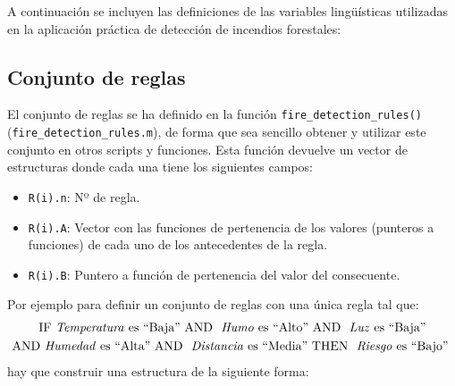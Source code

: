 A continuación se incluyen las definiciones de las variables lingüísticas utilizadas en la aplicación práctica de detección de incendios forestales:













\subsection{Conjunto de reglas}

El conjunto de reglas se ha definido en la función \lstinline|fire_detection_rules()| (\lstinline|fire_detection_rules.m|), de forma que sea sencillo obtener y utilizar este conjunto en otros scripts y funciones. Esta función devuelve un vector de estructuras donde cada una tiene los siguientes campos:
\begin{itemize}
\item \lstinline|R(i).n|: Nº de regla.
\item \lstinline|R(i).A|: Vector con las funciones de pertenencia de los valores (punteros a funciones) de cada uno de los antecedentes de la regla.
\item \lstinline|R(i).B|: Puntero a función de pertenencia del valor del consecuente.
\end{itemize}

Por ejemplo para definir un conjunto de reglas con una única regla tal que:
\begin{multline}
\text{IF \emph{Temperatura} es ``Baja'' AND }  \text{ \emph{Humo} es ``Alto'' AND } \text{ \emph{Luz} es ``Baja''} \\
  \text{AND \emph{Humedad} es ``Alta'' AND }  \text{ \emph{Distancia} es ``Media'' THEN }  \text{ \emph{Riesgo} es ``Bajo'' }
\end{multline}
hay que construir una estructura de la siguiente forma:

